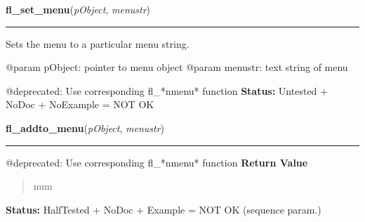     \label{xformslib:deprecated:fl_set_menu}

    \vspace{0.5ex}

\hspace{.8\funcindent}\begin{boxedminipage}{\funcwidth}

    \raggedright \textbf{fl\_set\_menu}(\textit{pObject}, \textit{menustr})

    \vspace{-1.5ex}

    \rule{\textwidth}{0.5\fboxrule}
\setlength{\parskip}{2ex}

Sets the menu to a particular menu string.

@param pObject: pointer to menu object
@param menustr: text string of menu

@deprecated: Use corresponding fl\_*nmenu* function
\setlength{\parskip}{1ex}
\textbf{Status:} 
Untested + NoDoc + NoExample = NOT OK


    \end{boxedminipage}

    \label{xformslib:deprecated:fl_addto_menu}

    \vspace{0.5ex}

\hspace{.8\funcindent}\begin{boxedminipage}{\funcwidth}

    \raggedright \textbf{fl\_addto\_menu}(\textit{pObject}, \textit{menustr})

    \vspace{-1.5ex}

    \rule{\textwidth}{0.5\fboxrule}
\setlength{\parskip}{2ex}

@deprecated: Use corresponding fl\_*nmenu* function
\setlength{\parskip}{1ex}
      \textbf{Return Value}
    \vspace{-1ex}

      \begin{quote}

num
      \end{quote}

\textbf{Status:} 
HalfTested + NoDoc + Example = NOT OK (sequence param.)


    \end{boxedminipage}

